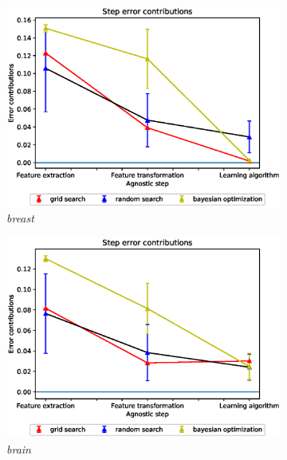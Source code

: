 \begin{figure}[ht!]
\centering
\begin{subfigure}{.5\textwidth}
  \centering
  \includegraphics[scale=0.37]{img/EP/agnostic_error_steps_breast.eps}
  \caption{\textit{breast}}
  \label{fig:eq_steps_breast}
\end{subfigure}%
\begin{subfigure}{.5\textwidth}
  \centering
  \includegraphics[scale=0.37]{img/EP/agnostic_error_steps_brain.eps}
  \caption{\textit{brain}}
  \label{fig:eq_step_brain}
\end{subfigure}
\begin{subfigure}{.5\textwidth}
  \centering

\end{subfigure}
\end{figure}
